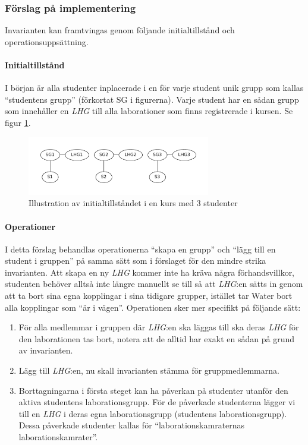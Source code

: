 \subsubsection{Förslag på implementering}
Invarianten kan  framtvingas genom följande initialtillstånd och operationsuppsättning.

\paragraph{Initialtillstånd}
I början är alla studenter inplacerade i en för varje student unik grupp som kallas “studentens grupp” (förkortat SG i figurerna). Varje student har en sådan grupp som innehåller en \emph{LHG} till alla laborationer som finns registrerade i kursen. Se figur \ref{fig:strict-initstate}.

\begin{figure}
  \centering
  \includegraphics[width=8.0cm]{fig/labgroup/strict_initstate.pdf}
  \caption{Illustration av initialtillståndet i en kurs med 3 studenter}\label{fig:strict-initstate}
\end{figure}

\paragraph{Operationer}
I detta förslag behandlas operationerna “skapa en grupp” och “lägg till en student i gruppen” på samma sätt som i förslaget för den mindre strika invarianten. Att skapa en ny \emph{LHG} kommer inte ha kräva några förhandsvillkor, studenten behöver alltså inte längre manuellt se till så att \emph{LHG}:en sätts in genom att ta bort sina egna kopplingar i sina tidigare grupper, istället tar Water bort alla kopplingar som “är i vägen”. Operationen sker mer specifikt på följande sätt:
\begin{enumerate}
  \item För alla medlemmar i gruppen där \emph{LHG}:en ska läggas till ska
    deras \emph{LHG} för den laborationen tas bort, notera att de alltid har
    exakt en sådan på grund av invarianten.
  \item Lägg till \emph{LHG}:en, nu skall invarianten stämma för gruppmedlemmarna.
  \item Borttagningarna i första steget kan ha påverkan på studenter utanför
  den aktiva studentens laborationsgrupp. För de påverkade studenterna lägger
  vi till en \emph{LHG} i  deras egna laborationsgrupp (studentens laborationsgrupp).
  Dessa påverkade studenter kallas för “laborationskamraternas
  laborationskamrater”.

\end{enumerate}

